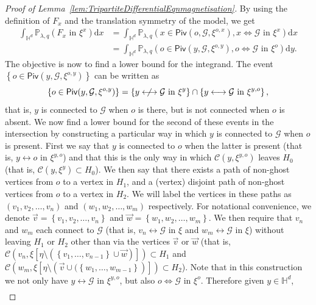 \documentclass[10pt,a4paper,dvipsnames]{article}
\theoremstyle{definition}
\theoremstyle{remark}
\newcommand{\plaq}{\mathbb{P}_{\lambda,q}}
\newcommand{\HypDim}{{\mathbb{H}^d}}
\newcommand{\dd}{\mathrm{d}} %
\newcommand{\C}{\mathscr {C}}
\newcommand{\piv}[1]{\mathsf {Piv}(#1)}
\newcommand{\Gcal}{\mathcal{G}}
\newcommand{\conn}[3]{#1 \longleftrightarrow #2\textrm { in } #3}
\newcommand{\nconn}[3]{#1 \centernot\longleftrightarrow #2\textrm { in } #3}
\newcommand{\dconn}[3]{#1 \Longleftrightarrow #2\textrm { in } #3}
\newcommand{\orig}{o}
\numberwithin{equation}{section}
\begin{document}
\begin{proof}[Proof of Lemma~\ref{lem:TripartiteDifferentialEqnmagnetisation}]
    By using the definition of $F_x$ and the translation symmetry of the model, we get
    \begin{align}
        \int_{\HypDim}\plaq\left(F_x\text{ in }\xi^{x}\right)\dd x & = \int_{\HypDim}\plaq\left(x\in\piv{\orig,\Gcal,\xi^{\orig, x}}, \dconn{x}{\Gcal}{\xi^x}\right)\dd x\nonumber\\
         & = \int_{\HypDim}\plaq\left(\orig\in\piv{y,\Gcal,\xi^{\orig, y}}, \dconn{\orig}{\Gcal}{\xi^\orig}\right)\dd y.
    \end{align}
    The objective is now to find a lower bound for the integrand. The event $\left\{\orig\in\piv{y,\Gcal,\xi^{\orig, y}}\right\}$ can be written as
    \begin{equation}
        \left\{\orig\in\piv{y,\Gcal,\xi^{\orig, y}}\right\} = \left\{\nconn{y}{\Gcal}{\xi^y}\right\}\cap\left\{\conn{y}{\Gcal}{\xi^{y,\orig}}\right\},
    \end{equation}
    that is, $y$ is connected to $\Gcal$ when $\orig$ is there, but is not connected when $\orig$ is absent. We now find a lower bound for the second of these events in the intersection by constructing a particular way in which $y$ is connected to $\Gcal$ when $\orig$ is present. First we say that $y$ is connected to $\orig$ when the latter is present (that is, $\conn{y}{\orig}{\xi^{y,\orig}}$) and that this is the only way in which $\C\left(y,\xi^{y,\orig}\right)$ leaves $H_0$ (that is, $\C\left(y,\xi^y\right)\subset H_0$). We then say that there exists a path of non-ghost vertices from $\orig$ to a vertex in $H_1$, and a (vertex) disjoint path of non-ghost vertices from $\orig$ to a vertex in $H_2$. We will label the vertices in these paths as $\left(v_1,v_2,\ldots,v_n\right)$ and $\left(w_1,w_2,\ldots,w_m\right)$ respectively. For notational convenience, we denote $\vec{v} = \left\{v_1,v_2,\ldots,v_n\right\}$ and $\vec{w}= \left\{w_1,w_2,\ldots,w_m\right\}$. We then require that $v_n$ and $w_m$ each connect to $\Gcal$ (that is, $\conn{v_n}{\Gcal}{\xi}$ and $\conn{w_m}{\Gcal}{\xi}$) without leaving $H_1$ or $H_2$ other than via the vertices $\vec{v}$ or $\vec{w}$ (that is, $\C\left(v_n,\xi\left[\eta\setminus\left(\left\{v_1,\ldots,v_{n-1}\right\}\cup\vec{w}\right)\right]\right)\subset H_1$ and $\C\left(w_m,\xi\left[\eta\setminus\left(\vec{v}\cup(\left\{w_1,\ldots,w_{m-1}\right\}\right)\right]\right)\subset H_2$). Note that in this construction we not only have $\conn{y}{\Gcal}{\xi^{y,\orig}}$, but also $\dconn{\orig}{\Gcal}{\xi^\orig}$. Therefore given $y\in\HypDim$,
    \begin{align}

\end{align}
\end{proof}
\end{document}
